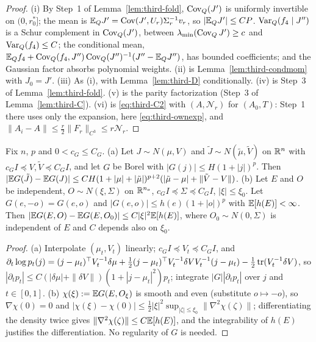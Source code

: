 \begin{proof}
(i) By Step~1 of Lemma~\ref{lem:third-fold}, $\operatorname{Cov}_Q(J')$ is uniformly invertible on $(0,r_0^*]$; the mean is $\mathbb E_QJ'=\operatorname{Cov}(J',U_r)\Sigma_r^{-1}v_r$, so $|\mathbb E_QJ'|\le CP$. $\operatorname{Var}_Q(f_4\mid J'')$ is a Schur complement in $\operatorname{Cov}_Q(J')$, between $\lambda_{\min}(\operatorname{Cov}_QJ')\ge c$ and $\operatorname{Var}_Q(f_4)\le C$; the conditional mean, $\mathbb E_Qf_4+\operatorname{Cov}_Q(f_4,J'')\operatorname{Cov}_Q(J'')^{-1}(J''-\mathbb E_QJ'')$, has bounded coefficients; and the Gaussian factor absorbs polynomial weights. (ii) is Lemma~\ref{lem:third-condmom} with $J_0=J'$. (iii) As (i), with Lemma~\ref{lem:third-D} conditionally. (iv) is Step~3 of Lemma~\ref{lem:third-fold}. (v) is the parity factorization (Step~3 of Lemma~\ref{lem:third-C}). (vi) is \eqref{eq:third-C2} with $(A,\mathcal N_r)$ for $(A_0,T)$: Step~1 there uses only the expansion, here \eqref{eq:third-ownexp}, and $\|A_i-A\|\le\frac r2\|F_r\|_{C^3}\le r\mathcal N_r$.
\end{proof}

\begin{lemma}\label{lem:third-G}
Fix $n$, $p$ and $0<c_G\le C_G$.
\textup{(a)} Let $J\sim N(\mu,V)$ and $\tilde J\sim N(\tilde\mu,\tilde V)$ on $\mathbb R^n$ with $c_GI\preceq V,\tilde V\preceq C_GI$, and let $G$ be Borel with $|G(j)|\le H(1+|j|)^p$. Then $|\mathbb E G(\tilde J)-\mathbb E G(J)|\le CH(1+|\mu|+|\tilde\mu|)^{p+2}(|\tilde\mu-\mu|+\|\tilde V-V\|)$.
\textup{(b)} Let $E$ and $O$ be independent, $O\sim N(\xi,\Sigma)$ on $\mathbb R^{n_o}$, $c_GI\preceq\Sigma\preceq C_GI$, $|\xi|\le\xi_0$. Let $G(e,-o)=G(e,o)$ and $|G(e,o)|\le h(e)(1+|o|)^p$ with $\mathbb E[h(E)]<\infty$. Then $|\mathbb E G(E,O)-\mathbb E G(E,O_0)|\le C|\xi|^2\mathbb E[h(E)]$, where $O_0\sim N(0,\Sigma)$ is independent of $E$ and $C$ depends also on $\xi_0$.
\end{lemma}

\begin{proof}
(a) Interpolate $(\mu_t,V_t)$ linearly; $c_GI\preceq V_t\preceq C_GI$, and $\partial_t\log p_t(j)=(j-\mu_t)^\top V_t^{-1}\delta\mu+\frac12(j-\mu_t)^\top V_t^{-1}\delta VV_t^{-1}(j-\mu_t)-\frac12\operatorname{tr}(V_t^{-1}\delta V)$, so $|\partial_tp_t|\le C(|\delta\mu|+\|\delta V\|)(1+|j-\mu_t|^2)p_t$; integrate $|G||\partial_tp_t|$ over $j$ and $t\in[0,1]$. (b) $\chi(\xi):=\mathbb E G(E,O_\xi)$ is smooth and even (substitute $o\mapsto-o$), so $\nabla\chi(0)=0$ and $|\chi(\xi)-\chi(0)|\le\frac12|\xi|^2\sup_{|\zeta|\le\xi_0}\|\nabla^2\chi(\zeta)\|$; differentiating the density twice gives $\|\nabla^2\chi(\zeta)\|\le C\mathbb E[h(E)]$, and the integrability of $h(E)$ justifies the differentiation. No regularity of $G$ is needed.
\end{proof}

